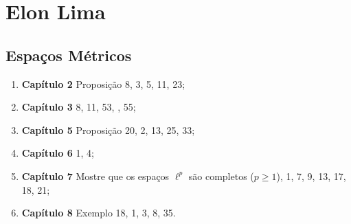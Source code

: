 \documentclass[latin,20pt]{article}
\begin{document}
  \section*{Elon Lima}
  \subsection*{Espaços Métricos} 
   \begin{enumerate}
    \item {\bf Capítulo 2} Proposição 8, 3, 5, 11, 23;
    \item {\bf Capítulo 3} 8, 11, 53, , 55;
    \item {\bf Capítulo 5} Proposição 20, 2, 13, 25, 33;
    \item {\bf Capítulo 6} 1, 4;
    \item {\bf Capítulo 7} Mostre que os espaços $\ell^{p}$ são completos ($p\geq 1$), 1, 7, 9, 13, 17, 18, 21; 
    \item {\bf Capítulo 8} Exemplo 18, 1, 3, 8, 35.
    \end{enumerate}
\end{document}

